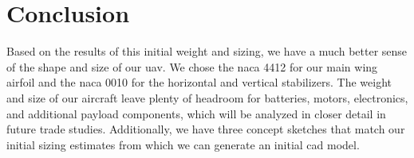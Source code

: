 \chapter{Conclusion}\label{cp:conclusion}

Based on the results of this initial weight and sizing, we have a much better sense of the shape and size of our \acrshort{uav}. We chose the \acrshort{naca} 4412 for our main wing airfoil and the \acrshort{naca} 0010 for the horizontal and vertical stabilizers. The weight and size of our aircraft leave plenty of headroom for batteries, motors, electronics, and additional payload components, which will be analyzed in closer detail in future trade studies. Additionally, we have three concept sketches that match our initial sizing estimates from which we can generate an initial \acrshort{cad} model.
